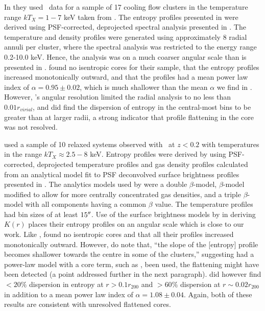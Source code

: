 \documentclass[12pt,preprint]{aastex}
\begin{document}
In \citet{piffaretti05} they used \xmm\ data for a sample of 17
cooling flow clusters in the temperature range $kT_X = 1-7$ keV taken
from \citet{2004A&A...413..415K}. The entropy profiles presented in
\citet{piffaretti05} were derived using PSF-corrected, deprojected
spectral analysis presented in \citet{2004A&A...413..415K}. The
temperature and density profiles were generated using approximately 8
radial annuli per cluster, where the spectral analysis was restricted
to the energy range 0.2-10.0 keV. Hence, the \citet{piffaretti05}
analysis was on a much coarser angular scale than is presented in
\accept. \citet{piffaretti05} found no isentropic cores for their
sample, that the entropy profiles increased monotonically outward, and
that the profiles had a mean power law index of $\alpha = 0.95 \pm
0.02$, which is much shallower than the mean $\alpha$ we find in
\accept. However, \xmm's angular resolution limited the radial
analysis to no less than $0.01 r_{virial}$, and \citet{piffaretti05}
did find the dispersion of entropy in the central-most bins to be
greater than at larger radii, a strong indicator that profile
flattening in the core was not resolved.

\citet{pratt06} used a sample of 10 relaxed systems observed with
\xmm\ at $z < 0.2$ with temperatures in the range $kT_X \approx 2.5-8$
keV. Entropy profiles were derived by \citet{pratt06} using
PSF-corrected, deprojected temperature profiles and gas density
profiles calculated from an analytical model fit to PSF deconvolved
surface brightness profiles presented in
\citet{2005A&A...435....1P}. The analytics models used by
\citet{2005A&A...435....1P} were a double $\beta$-model, $\beta$-model
modified to allow for more centrally concentrated gas densities, and a
triple $\beta$-model with all components having a common $\beta$
value. The temperature profiles had bin sizes of at least
$15\mathrm{^\prime}\hskip -0.1em\mathrm{^\prime}$. Use of the surface brightness models by \citet{pratt06} in
deriving $K(r)$ places their entropy profiles on an angular scale
which is close to our work. Like \citet{piffaretti05}, \citet{pratt06}
found no isentropic cores and that all their profiles increased
monotonically outward. However, \citet{pratt06} do note that, ``the
slope of the [entropy] profile becomes shallower towards the centre in
some of the clusters,'' suggesting had a power-law model with a core
term, such as \kna, been used, the flattening might have been detected
(a point addressed further in the next paragraph). \citet{pratt06} did
however find $< 20\%$ dispersion in entropy at $r > 0.1r_{200}$ and $>
60\%$ dispersion at $r \sim 0.02r_{200}$ in addition to a mean power
law index of $\alpha = 1.08 \pm 0.04$. Again, both of these results
are consistent with unresolved flattened cores.
\end{document}

